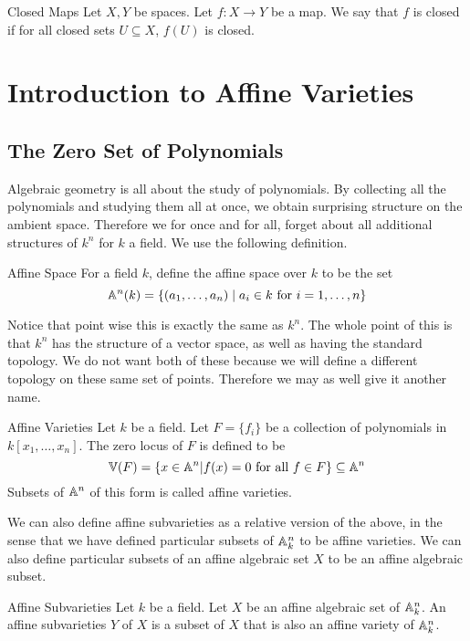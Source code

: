 \documentclass[a4paper]{article}
\begin{document}
\begin{defn}{Closed Maps}{} Let $X,Y$ be spaces. Let $f:X\to Y$ be a map. We say that $f$ is closed if for all closed sets $U\subseteq X$, $f(U)$ is closed. 
\end{defn}

\pagebreak
\section{Introduction to Affine Varieties}
\subsection{The Zero Set of Polynomials}
Algebraic geometry is all about the study of polynomials. By collecting all the polynomials and studying them all at once, we obtain surprising structure on the ambient space. Therefore we for once and for all, forget about all additional structures of $k^n$ for $k$ a field. We use the following definition. 

\begin{defn}{Affine Space}{} For a field $k$, define the affine space over $k$ to be the set $$\mathbb{A}^n(k)=\{(a_1,\dots,a_n)\;|\;a_i\in k\text{ for }i=1,\dots,n\}$$
\end{defn}

Notice that point wise this is exactly the same as $k^n$. The whole point of this is that $k^n$ has the structure of a vector space, as well as having the standard topology. We do not want both of these because we will define a different topology on these same set of points. Therefore we may as well give it another name. 

\begin{defn}{Affine Varieties}{} Let $k$ be a field. Let $F=\{f_i\}$ be a collection of polynomials in $k[x_1,\dots,x_n]$. The zero locus of $F$ is defined to be $$\mathbb{V}(F)=\{x\in\mathbb{A}^n|f(x)=0\text{ for all }f\in F\}\subseteq\mathbb{A}^n$$ Subsets of $\mathbb{A}^n$ of this form is called affine varieties. 
\end{defn}

We can also define affine subvarieties as a relative version of the above, in the sense that we have defined particular subsets of $\mathbb{A}_k^n$ to be affine varieties. We can also define particular subsets of an affine algebraic set $X$ to be an affine algebraic subset. 

\begin{defn}{Affine Subvarieties}{} Let $k$ be a field. Let $X$ be an affine algebraic set of $\mathbb{A}_k^n$. An affine subvarieties $Y$ of $X$ is a subset of $X$ that is also an affine variety of $\mathbb{A}_k^n$. 
\end{defn}
\end{document}
